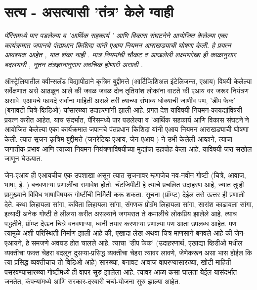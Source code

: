 \chapter{सत्य - असत्यासी 'तंत्र' केले ग्वाही}

{\textit{पॅरिसमध्ये पार पडलेल्या व 'आर्थिक सहकार्य '  आणि विकास संघटनेने आयोजित केलेल्या एका कार्यक्रमात जपानचे पंतप्रधान किशिदा यांनी एआय नियमन आराखड्याची घोषणा केली. हे प्रयत्न आवश्यक आहेत ,  यात शंका नाही .  मात्र नियमांची चौकट व आखलेली लक्ष्मणरेखा ही काळानुसार बदलणारी , नूतन तंत्रज्ञानानुसार लवचिक होणारी असावी . }}

\vspace{1.5em}

ऑस्ट्रेलियातील क्वीन्सलँड विद्यापीठाने कृत्रिम बुद्दीमत्ते (आर्टिफिशिअल इंटेलिजन्स, एआय) विषयी केलेल्या सर्वेक्षणात असे आढळून आले की जवळ जवळ दोन तृतियांश लोकांना वाटते की एआय वर जरूर नियंत्रण असावे. एआयचे फायदे सर्वांना माहिती असले तरी त्याच्या संभाव्य धोक्याची जाणीव पण, 'डीप फेक' (बनावटी चित्रे-व्हिडिओ) यांसारख्या उदाहरणांनी झाली आहे. प्रगत देश याविषयी नियमन-कायद्यांविषयी प्रयत्न करीत आहेत. याच संदर्भात, पॅरिसमध्ये पार पडलेल्या व 'आर्थिक सहकार्य आणि विकास संघटने'ने आयोजित केलेल्या एका कार्यक्रमात जपानचे पंतप्रधान किशिदा यांनी एआय नियमन आराखड्याची घोषणा केली. त्यात सृजन कृत्रिम बुद्दीमत्ते (जनरेटिव्ह एआय, जेन-एआय ) ने उभी केलेली आव्हाने, त्याचा जगातीक प्रभाव आणि त्याच्या नियमन-नियंत्रणाविषयीच्या मुद्यांचा उहापोह केला आहे. याविषयी जरा सखोल जाणून घेऊयात.

जेन-एआय ही एआयचीच एक उपशाखा असून त्यात सृजनावर म्हणजेच नव-नवीन गोष्टी (चित्रे, आवाज, भाषा, ई. ) बनवणाऱ्या प्रणालींचा समावेश होतो. चॅटजिपीटी हे त्याचे प्रचलित उदाहरण आहे, ज्यात तुम्ही प्रामुख्याने विविध भाषाविषयक गोष्टींची निर्मिती करू शकता. सूचना (प्रॉम्प्ट) देईल तसे ऊत्तर ही प्रणाली देते. कथा लिहायला सांगा, कविता लिहायला सांगा, संगणक प्रोग्रॅम लिहायला सांगा, सारांश काढायला सांगा, इत्यादी अनेक गोष्टी ते लीलया करीत असल्याने जगभरात ते कमालीचे लोकप्रिय झालेले आहे. त्याच पद्धतीने, प्रॉम्प्ट देऊन चित्रे बनवणाऱ्या, ध्वनी तयार करणाऱ्या प्रणाल्या पण आता उपलब्ध आहेत. पण त्यामुळे अशी परिस्थिती निर्माण झाली आहे की, एखादा लेख अथवा चित्र माणसाने बनवले आहे की जेन-एआयने, हे समजणे अवघड होत चालले आहे. त्याचा 'डीप फेक' (उदाहरणार्थ, एखाद्या व्हिडीओ मधील व्यक्तीचा फक्त चेहरा बदलून दुसऱ्या-प्रसिद्ध व्यक्तीचा चेहरा त्यावर लावणे, जेणेकरून असा भास होईल कि त्या प्रसिद्ध व्यक्तीचाच तो विडिओ आहे) सारख्या, बनावट आवाज वापरण्यासारख्या, खोटी माहिती पसरवण्यासारख्या गोष्टींमध्ये ही वापर सुरु झालेला आहे. त्यावर आळा कसा घालता येईल यासंदर्भात जनतेत, कंपन्यांमध्ये आणि सरकार-दरबारी चर्चा-योजना सुरु झाल्या आहेत.


